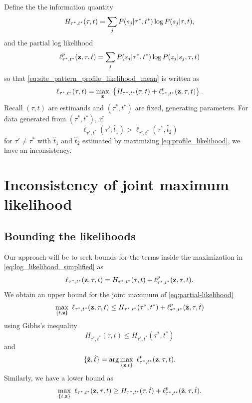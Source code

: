 \documentclass[a4paper]{article}
\begin{document}
Define the the information quantity
$$
H_{\tau^*,t^*}(\tau,t) = \sum_{j} P(s_j | \tau^*, t^*) \log P(s_j | \tau, t),
$$
and the partial log likelihood
$$
\ell^p_{\tau^*,t^*}(\mathbf{z},\tau,t) = \sum_{j} P(s_j | \tau^*, t^*) \log P(z_j | s_j, \tau, t)
$$
so that \eqref{eq:site_pattern_profile_likelihood_mean} is written as
\begin{equation}
    \label{eq:log_likelihood_simplified}
\ell_{\tau^*,t^*}(\tau,t) = \max_{\fullAncestralStateCategories} \ \left\{H_{\tau^*,t^*}(\tau,t) + \ell^p_{\tau^*,t^*}(\fullAncestralStateCategories,\tau,t)\right\}.
\end{equation}
Recall $(\tau, t)$ are estimands and $(\tau^*, t^*)$ are fixed, generating parameters.
For data generated from $(\tau^*, t^*)$, if
\begin{equation}
\label{eq:inconsistency_inequality}
\ell_{\tau^*,t^*}(\tau',\hat{t}_1) > \ell_{\tau^*,t^*}(\tau^*,\hat{t}_2)
\end{equation}
for $\tau'\neq\tau^*$ with $\hat{t}_1$ and $\hat{t}_2$ estimated by maximizing \eqref{eq:profile_likelihood}, we have an inconsistency.

\section{Inconsistency of joint maximum likelihood}

\subsection{Bounding the likelihoods}

Our approach will be to seek bounds for the terms inside the maximization in \eqref{eq:log_likelihood_simplified} as
\begin{equation}
\label{eq:partial-likelihood}
\ell_{\tau^*,t^*}(\mathbf{z},\tau,t) = H_{\tau^*,t^*}(\tau,t) + \ell^p_{\tau^*,t^*}(\mathbf{z},\tau,t).
\end{equation}
We obtain an upper bound for the joint maximum of \eqref{eq:partial-likelihood}
$$
\max_{\{t,\fullAncestralStateCategories\}} \ \ell_{\tau^*,t^*}(\fullAncestralStateCategories,\tau,t) \le
    H_{\tau^*,t^*}(\tau^*,t^*)
    + \ell^p_{\tau^*,t^*}(\hat{\fullAncestralStateCategories},\tau,\hat{t})
$$
using Gibbs's inequality
$$
H_{\tau^*,t^*}(\tau,t) \le H_{\tau^*,t^*}(\tau^*,t^*)
$$
and
$$
\{\hat{\fullAncestralStateCategories},\hat{t}\} = \arg\max_{\{\fullAncestralStateCategories,t\}} \ \ell^p_{\tau^*,t^*}(\fullAncestralStateCategories,\tau,t).
$$
Similarly, we have a lower bound as
$$
\max_{\{t,\fullAncestralStateCategories\}} \ \ell_{\tau^*,t^*}(\fullAncestralStateCategories,\tau,t) \ge
    H_{\tau^*,t^*}(\tau,\hat{t})
    + \ell^p_{\tau^*,t^*}(\hat{\fullAncestralStateCategories},\tau,\hat{t}).
$$
\end{document}
